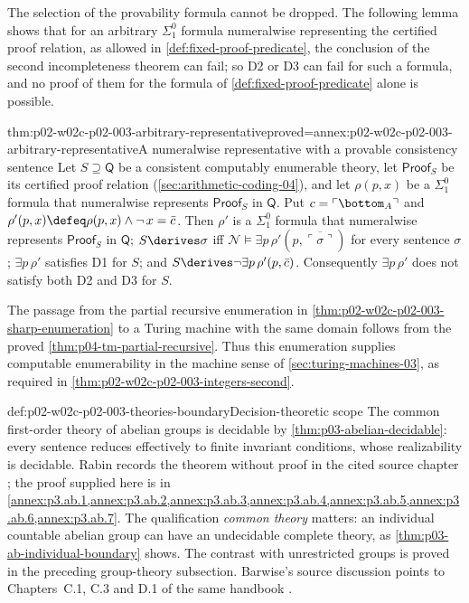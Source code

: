 The selection of the provability formula cannot be dropped.  The following
lemma shows that for an arbitrary \(\Sigma^0_1\) formula numeralwise
representing the certified proof relation, as allowed in
\cref{def:fixed-proof-predicate}, the conclusion of the second
incompleteness theorem can fail; so D2 or D3 can fail for such a formula,
and no proof of them for the formula of \cref{def:fixed-proof-predicate}
alone is possible.

\begin{hblemma}{thm:p02-w02c-p02-003-arbitrary-representative}{proved=annex:p02-w02c-p02-003-arbitrary-representative}{A numeralwise representative with a provable consistency sentence}
Let \(S\supseteq\mathsf Q\) be a consistent computably enumerable theory,
let \(\mathsf{Proof}_S\) be its certified proof relation
(\cref{sec:arithmetic-coding-04}), and let \(\rho(p,x)\) be a
\(\Sigma^0_1\) formula that numeralwise represents \(\mathsf{Proof}_S\) in
\(\mathsf Q\).  Put \(c=\ulcorner\bottom_A\urcorner\) and
\(\rho'(p,x)\defeq\rho(p,x)\land\neg\,x=\bar c\).  Then \(\rho'\) is a
\(\Sigma^0_1\) formula that numeralwise represents \(\mathsf{Proof}_S\) in
\(\mathsf Q\); \(S\derives\sigma\) iff
\(\mathcal N\models\exists p\,\rho'(p,\overline{\ulcorner\sigma\urcorner})\)
for every sentence \(\sigma\); \(\exists p\,\rho'\) satisfies D1 for \(S\);
and \(S\derives\neg\exists p\,\rho'(p,\bar c)\).  Consequently
\(\exists p\,\rho'\) does not satisfy both D2 and D3 for \(S\).
\end{hblemma}

The passage from the partial recursive enumeration in
\cref{thm:p02-w02c-p02-003-sharp-enumeration} to a Turing machine with
the same domain follows from the proved
\cref{thm:p04-tm-partial-recursive}. Thus this enumeration supplies
computable enumerability in the machine sense of
\cref{sec:turing-machines-03}, as required in
\cref{thm:p02-w02c-p02-003-integers-second}.


\begin{hbconvention}{def:p02-w02c-p02-003-theories-boundary}{Decision-theoretic scope}
The common first-order theory of abelian groups is decidable by
\cref{thm:p03-abelian-decidable}: every sentence reduces effectively to
finite invariant conditions, whose realizability is decidable.
Rabin records the theorem without proof in the cited source chapter
\cite[p.~611, Theorem~7]{Rabin1977Decidable}; the proof supplied here is
in \cref{annex:p3.ab.1,annex:p3.ab.2,annex:p3.ab.3,annex:p3.ab.4,annex:p3.ab.5,annex:p3.ab.6,annex:p3.ab.7}.
The qualification \emph{common theory} matters: an individual countable
abelian group can have an undecidable complete theory, as
\cref{thm:p03-ab-individual-boundary} shows. The contrast with unrestricted
groups is proved in the preceding group-theory subsection. Barwise's
source discussion points to Chapters~C.1, C.3 and D.1 of the same handbook
\cite[ch.~A.1, \S2, p.~16]{Barwise1977FirstOrder}.
\end{hbconvention}

